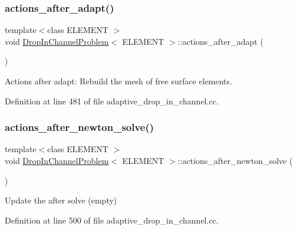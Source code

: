 \subsubsection{\texorpdfstring{actions\+\_\+after\+\_\+adapt()}{actions\_after\_adapt()}}
{\footnotesize\ttfamily template$<$class E\+L\+E\+M\+E\+NT $>$ \\
void \hyperlink{classDropInChannelProblem}{Drop\+In\+Channel\+Problem}$<$ E\+L\+E\+M\+E\+NT $>$\+::actions\+\_\+after\+\_\+adapt (\begin{DoxyParamCaption}{ }\end{DoxyParamCaption})\hspace{0.3cm}{\ttfamily [inline]}}



Actions after adapt\+: Rebuild the mesh of free surface elements. 



Definition at line 481 of file adaptive\+\_\+drop\+\_\+in\+\_\+channel.\+cc.

\mbox{\label{classDropInChannelProblem_ab38a14018a4093afe7cc0d9db9f1fc3b}} 
\subsubsection{\texorpdfstring{actions\+\_\+after\+\_\+newton\+\_\+solve()}{actions\_after\_newton\_solve()}}
{\footnotesize\ttfamily template$<$class E\+L\+E\+M\+E\+NT $>$ \\
void \hyperlink{classDropInChannelProblem}{Drop\+In\+Channel\+Problem}$<$ E\+L\+E\+M\+E\+NT $>$\+::actions\+\_\+after\+\_\+newton\+\_\+solve (\begin{DoxyParamCaption}{ }\end{DoxyParamCaption})\hspace{0.3cm}{\ttfamily [inline]}}



Update the after solve (empty) 



Definition at line 500 of file adaptive\+\_\+drop\+\_\+in\+\_\+channel.\+cc.

\mbox{\label{classDropInChannelProblem_a4d4ae7fdef14f9838a46cc45278c7920}} 
